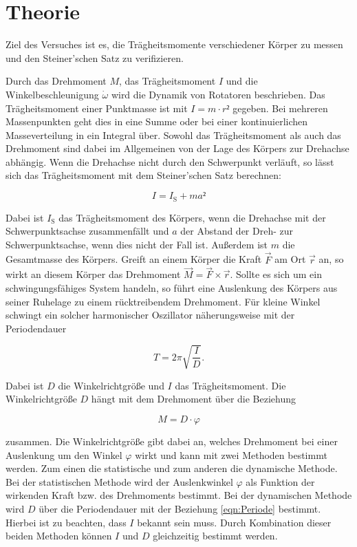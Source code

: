\section{Theorie}
\label{sec:Theorie}

Ziel des Versuches ist es, die Trägheitsmomente verschiedener Körper 
zu messen und den Steiner'schen Satz zu verifizieren.

Durch das Drehmoment $M$, das Trägheitsmoment $I$ und die Winkelbeschleunigung 
$\dot\omega$ wird die Dynamik von Rotatoren beschrieben. Das Trägheitsmoment
einer Punktmasse ist mit $I = m\cdot r²$ gegeben. Bei mehreren Massenpunkten
geht dies in eine Summe oder bei einer kontinuierlichen Masseverteilung 
in ein Integral über. Sowohl das Trägheitsmoment als auch das Drehmoment 
sind dabei im Allgemeinen von der Lage des Körpers zur Drehachse abhängig. 
Wenn die Drehachse nicht durch den Schwerpunkt verläuft, so lässt sich das
Trägheitsmoment mit dem Steiner'schen Satz berechnen: 

\begin{equation}
I = I_\text{S} + ma² 
\label{eqn:Steiner}
\end{equation}

Dabei ist $I_\text{S}$ das Trägheitsmoment des Körpers, wenn die Drehachse mit der 
Schwerpunktsachse zusammenfällt und $a$ der Abstand der Dreh- zur Schwerpunktsachse, 
wenn dies nicht der Fall ist. Außerdem ist $m$ die Gesamtmasse des Körpers.
Greift an einem Körper die Kraft $\vec{F}$ am Ort $\vec{r}$ an, so wirkt 
an diesem Körper das Drehmoment $\vec{M} = \vec{F} \times \vec{r}$. Sollte es
sich um ein schwingungsfähiges System handeln, so führt eine Auslenkung des 
Körpers aus seiner Ruhelage zu einem rücktreibendem Drehmoment. Für kleine
Winkel schwingt ein solcher harmonischer Oszillator näherungsweise mit 
der Periodendauer

\begin{equation}
T = 2\pi\sqrt{\frac{I}{D}}.
\label{eqn:Periode}
\end{equation}

Dabei ist $D$ die Winkelrichtgröße und $I$ das Trägheitsmoment. Die 
Winkelrichtgröße $D$ hängt mit dem Drehmoment über die Beziehung 

\begin{equation}
M = D\cdot\varphi
\label{eqn:Winkelrichtgröße}
\end{equation}

zusammen. Die Winkelrichtgröße gibt dabei an, welches Drehmoment bei einer 
Auslenkung um den Winkel $\varphi$ wirkt und kann mit zwei Methoden bestimmt 
werden. Zum einen die statistische und zum anderen die dynamische Methode. 
Bei der statistischen Methode wird der Auslenkwinkel $\varphi$ als Funktion
der wirkenden Kraft bzw. des Drehmoments bestimmt. Bei der dynamischen 
Methode wird $D$ über die Periodendauer mit der Beziehung \eqref{eqn:Periode}
bestimmt. Hierbei ist zu beachten, dass $I$ bekannt sein muss. 
Durch Kombination dieser beiden Methoden können $I$ und $D$ gleichzeitig
bestimmt werden. 

